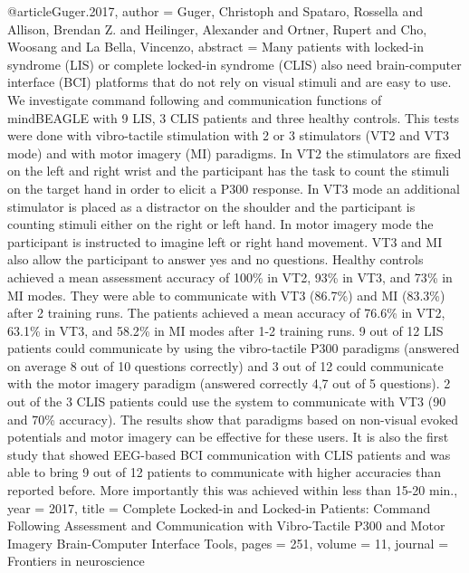 @article{Guger.2017,
 author = {Guger, Christoph and Spataro, Rossella and Allison, Brendan Z. and Heilinger, Alexander and Ortner, Rupert and Cho, Woosang and {La Bella}, Vincenzo},
 abstract = {Many patients with locked-in syndrome (LIS) or complete locked-in syndrome (CLIS) also need brain-computer interface (BCI) platforms that do not rely on visual stimuli and are easy to use. We investigate command following and communication functions of mindBEAGLE with 9 LIS, 3 CLIS patients and three healthy controls. This tests were done with vibro-tactile stimulation with 2 or 3 stimulators (VT2 and VT3 mode) and with motor imagery (MI) paradigms. In VT2 the stimulators are fixed on the left and right wrist and the participant has the task to count the stimuli on the target hand in order to elicit a P300 response. In VT3 mode an additional stimulator is placed as a distractor on the shoulder and the participant is counting stimuli either on the right or left hand. In motor imagery mode the participant is instructed to imagine left or right hand movement. VT3 and MI also allow the participant to answer yes and no questions. Healthy controls achieved a mean assessment accuracy of 100{\%} in VT2, 93{\%} in VT3, and 73{\%} in MI modes. They were able to communicate with VT3 (86.7{\%}) and MI (83.3{\%}) after 2 training runs. The patients achieved a mean accuracy of 76.6{\%} in VT2, 63.1{\%} in VT3, and 58.2{\%} in MI modes after 1-2 training runs. 9 out of 12 LIS patients could communicate by using the vibro-tactile P300 paradigms (answered on average 8 out of 10 questions correctly) and 3 out of 12 could communicate with the motor imagery paradigm (answered correctly 4,7 out of 5 questions). 2 out of the 3 CLIS patients could use the system to communicate with VT3 (90 and 70{\%} accuracy). The results show that paradigms based on non-visual evoked potentials and motor imagery can be effective for these users. It is also the first study that showed EEG-based BCI communication with CLIS patients and was able to bring 9 out of 12 patients to communicate with higher accuracies than reported before. More importantly this was achieved within less than 15-20 min.},
 year = {2017},
 title = {{Complete Locked-in and Locked-in Patients: Command Following Assessment and Communication with Vibro-Tactile P300 and Motor Imagery Brain-Computer Interface Tools}},
 pages = {251},
 volume = {11},
 journal = {{Frontiers in neuroscience}}
}


